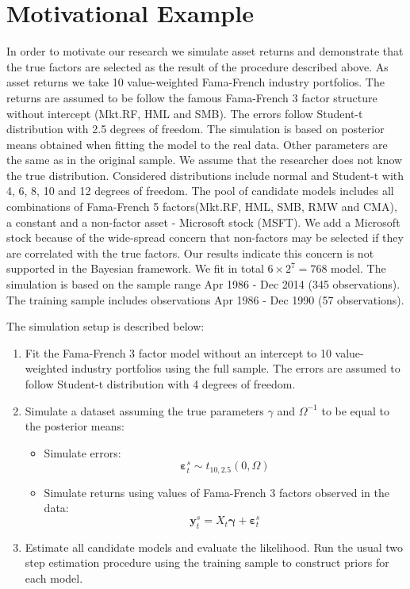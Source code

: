 
\section{Motivational Example}
In order to motivate our research we simulate asset returns and demonstrate that the true factors are selected as the result of the procedure described above. 
As asset returns we take 10 value-weighted Fama-French industry portfolios. 
The returns are assumed to be follow the famous Fama-French 3 factor structure without intercept (Mkt.RF, HML and SMB). 
The errors follow Student-t distribution with 2.5 degrees of freedom. 
The simulation is based on posterior means obtained when fitting the model to the real data. 
Other parameters are the same as in the original sample.
We assume that the researcher does not know the true distribution. 
Considered distributions include normal and Student-t with 4, 6, 8, 10 and 12 degrees of freedom. 
The pool of candidate models includes all combinations of Fama-French 5 factors(Mkt.RF, HML, SMB, RMW and CMA), a constant and a non-factor asset - Microsoft stock (MSFT). 
We add a Microsoft stock  because of the wide-spread concern that non-factors may be selected if they are correlated with the true factors.
Our results indicate this concern is not supported in the Bayesian framework. 
We fit in total $6\times 2^{7} = 768$ model. 
The simulation is based on the sample range Apr 1986 - Dec 2014 (345 observations). 
The training sample includes observations Apr 1986 - Dec 1990 (57 observations).

The simulation setup is described below:
\begin{enumerate}
	\item Fit the Fama-French 3 factor model without an intercept to 10 value-weighted industry portfolios using the full sample. The errors are assumed to follow Student-t distribution with 4 degrees of freedom. 
	\item Simulate a dataset assuming the true parameters  $\gamma$ and $\Omega^{-1} $ to be equal to the posterior means:
	\begin{itemize}
		\item Simulate errors:
		\begin{equation*}
		\boldsymbol{\varepsilon}^s_{t}\sim t_{10,2.5 }\left( 0,\Omega \right)
		\end{equation*}
		\item Simulate returns using values of Fama-French 3 factors observed in the data:
		\begin{equation*}
		\mathbf{y}_t^s = X_t \boldsymbol{\gamma} + \boldsymbol{\varepsilon}^s_t
		\end{equation*}
	\end{itemize}
	\item Estimate all candidate models and evaluate the likelihood. Run the usual two step estimation procedure using the training sample to construct priors for each model.  
\end{enumerate}

